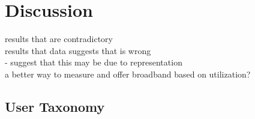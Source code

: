\section{Discussion}
\label{sec:discussion}
results that are contradictory\\
results that data suggests that is wrong\\ 
- suggest that this may be due to representation\\
a better way to measure and offer broadband based on utilization?

\subsection{User Taxonomy}
\label{subsec:taxonomy}


